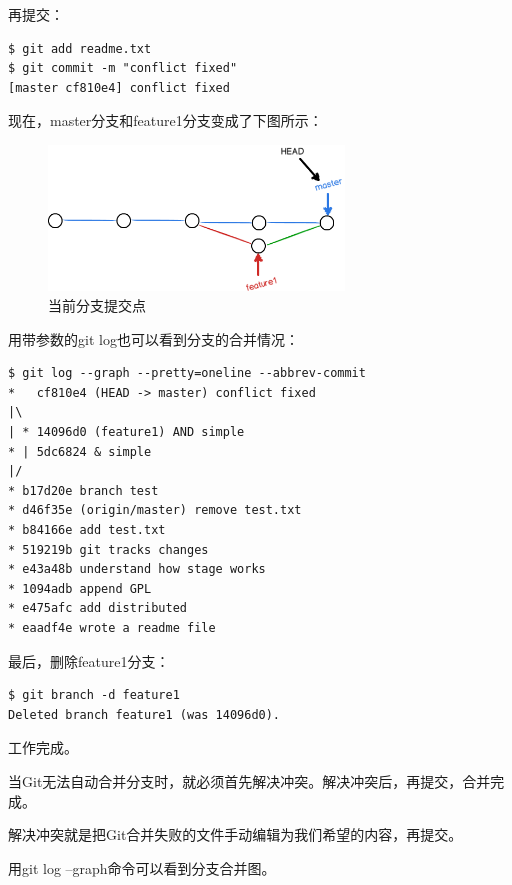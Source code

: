 再提交：

\begin{verbatim}
$ git add readme.txt 
$ git commit -m "conflict fixed"
[master cf810e4] conflict fixed
\end{verbatim}

现在，master分支和feature1分支变成了下图所示：

\begin{figure}[h]
  \centering
  \includegraphics[width=0.7\textwidth]{img/git-br-conflict-merged.png}
  \caption{当前分支提交点}
  \label{fig:git-br-conflict-merged}
\end{figure}

用带参数的git log也可以看到分支的合并情况：

\begin{verbatim}
$ git log --graph --pretty=oneline --abbrev-commit
*   cf810e4 (HEAD -> master) conflict fixed
|\  
| * 14096d0 (feature1) AND simple
* | 5dc6824 & simple
|/  
* b17d20e branch test
* d46f35e (origin/master) remove test.txt
* b84166e add test.txt
* 519219b git tracks changes
* e43a48b understand how stage works
* 1094adb append GPL
* e475afc add distributed
* eaadf4e wrote a readme file
\end{verbatim}

最后，删除feature1分支：

\begin{verbatim}
$ git branch -d feature1
Deleted branch feature1 (was 14096d0).
\end{verbatim}

工作完成。

\begin{tcolorbox}

当Git无法自动合并分支时，就必须首先解决冲突。解决冲突后，再提交，合并完成。

解决冲突就是把Git合并失败的文件手动编辑为我们希望的内容，再提交。

用git log --graph命令可以看到分支合并图。
\end{tcolorbox}


